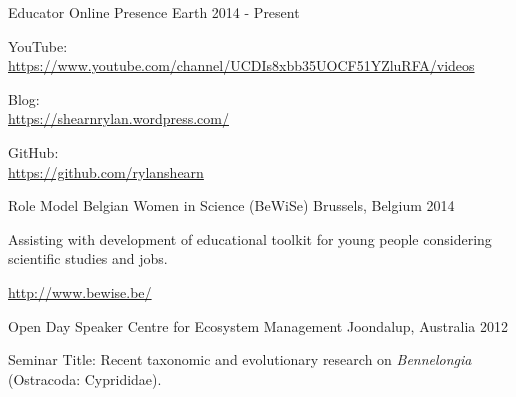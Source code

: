 

\begin{cventries}

  \cventry
    {Educator} %
    {Online Presence} %
    {Earth} %
    {2014 - Present} %
    {
	  \begin{cvitems} %
		\item YouTube: \\{\href{https://www.youtube.com/channel/UCDIs8xbb35UOCF51YZluRFA/videos}{https://www.youtube.com/channel/UCDIs8xbb35UOCF51YZluRFA/videos}} %
		\item Blog: \\{\href{https://shearnrylan.wordpress.com/}{https://shearnrylan.wordpress.com/}}
		\item GitHub: \\{\href{https://github.com/rylanshearn}{https://github.com/rylanshearn}}
	  \end{cvitems}
    }

  \cventry
    {Role Model} %
    {Belgian Women in Science (BeWiSe)} %
    {Brussels, Belgium} %
    {2014} %
    {
	  \begin{cvitems} %
		\item {Assisting with development of educational toolkit for young people considering scientific studies and jobs.}
		\item {\href{http://www.bewise.be/}{http://www.bewise.be/}}
	  \end{cvitems}
    }

  \cventry
    {Open Day Speaker} %
    {Centre for Ecosystem Management} %
    {Joondalup, Australia} %
    {2012} %
    {
      \begin{cvitems} %
        \item {Seminar Title: Recent taxonomic and evolutionary research on \textit{Bennelongia} (Ostracoda: Cyprididae).}
      \end{cvitems}
    }


\end{cventries}
